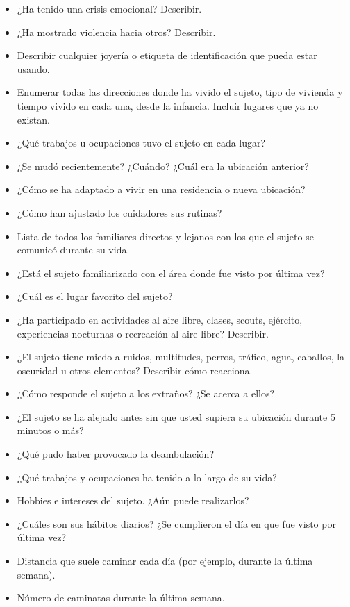 \begin{itemize}
    \item ¿Ha tenido una crisis emocional? Describir.
    \item ¿Ha mostrado violencia hacia otros? Describir.
    \item Describir cualquier joyería o etiqueta de identificación que pueda estar usando.
    \item Enumerar todas las direcciones donde ha vivido el sujeto, tipo de vivienda y tiempo vivido en cada una, desde la infancia. Incluir lugares que ya no existan.
    \item ¿Qué trabajos u ocupaciones tuvo el sujeto en cada lugar?
    \item ¿Se mudó recientemente? ¿Cuándo? ¿Cuál era la ubicación anterior?
    \item ¿Cómo se ha adaptado a vivir en una residencia o nueva ubicación?
    \item ¿Cómo han ajustado los cuidadores sus rutinas?
    \item Lista de todos los familiares directos y lejanos con los que el sujeto se comunicó durante su vida.
    \item ¿Está el sujeto familiarizado con el área donde fue visto por última vez?
    \item ¿Cuál es el lugar favorito del sujeto?
    \item ¿Ha participado en actividades al aire libre, clases, scouts, ejército, experiencias nocturnas o recreación al aire libre? Describir.
    \item ¿El sujeto tiene miedo a ruidos, multitudes, perros, tráfico, agua, caballos, la oscuridad u otros elementos? Describir cómo reacciona.
    \item ¿Cómo responde el sujeto a los extraños? ¿Se acerca a ellos?
    \item ¿El sujeto se ha alejado antes sin que usted supiera su ubicación durante 5 minutos o más?
    \item ¿Qué pudo haber provocado la deambulación?
    \item ¿Qué trabajos y ocupaciones ha tenido a lo largo de su vida?
    \item Hobbies e intereses del sujeto. ¿Aún puede realizarlos?
    \item ¿Cuáles son sus hábitos diarios? ¿Se cumplieron el día en que fue visto por última vez?
    \item Distancia que suele caminar cada día (por ejemplo, durante la última semana).
    \item Número de caminatas durante la última semana.

\end{itemize}
